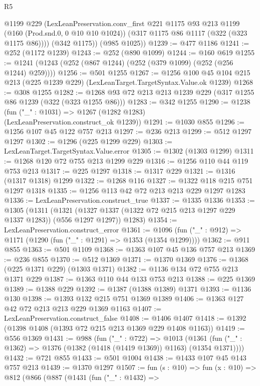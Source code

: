 \begin{lexlean}{R5}
\begin{coremodule}
        @1199
        @229
        (LexLeanPreservation.conv_first
          @221
          @1175
          @93
          @213
          @1199
          (@160 (Prod.snd.{0, 0} @10 @10 @1024))
          (@317 @1175 @86 @1117 (@322 (@323 @1175 @86))))
        (@342 @1175))
      (@985 @1025))
@1239 := @477 @1186
@1241 := @252 (@1172 @1239)
@1243 := @252 (@890 @1099)
@1244 := @160 @619
@1255 := @1241 (@1243 (@252 (@867 @1244) (@252 (@379 @1099) (@252 (@256 @1244) @259))))
@1256 := @501 @1255
@1267 := @1256 @100 @45 @104 @215 @213 (@225 @1239 @229) (LexLeanTarget.TargetSyntax.Value.ok @1239)
@1268 := @308 @1255
@1282 := @1268 @93 @72 @213 @213 @1239 @229 (@317 @1255 @86 @1239 (@322 (@323 @1255 @86)))
@1283 := @342 @1255
@1290 := @1238 (fun ("_" : @1031) => @1267 (@1282 @1283) (LexLeanPreservation.construct_ok @1239))
@1291 := @1030 @855
@1296 := @1256 @107 @45 @122 @757 @213
@1297 := @236 @213
@1299 := @512 @1297 @1297
@1302 := @1296 (@225 @1299 @229)
@1303 := LexLeanTarget.TargetSyntax.Value.error
@1305 := @1302 (@1303 @1299)
@1311 := @1268 @120 @72 @755 @213 @1299 @229
@1316 := @1256 @110 @44 @119 @753 @213
@1317 := @225 @1297
@1318 := @1317 @229
@1321 := @1316 (@1317 @1318) @1299
@1322 := @1268 @116
@1327 := @1322 @118 @215 @751 @1297 @1318
@1335 := @1256 @113 @42 @72 @213 @213 @229 @1297 @1283
@1336 := LexLeanPreservation.construct_true
@1337 := @1335 @1336
@1353 := @1305
    (@1311
      (@1321 (@1327 @1337 (@1322 @72 @215 @213 @1297 @229 @1337 @1283)) (@556 @1297 @1297))
      @1283)
@1354 := LexLeanPreservation.construct_error
@1361 := @1096 (fun ("_" : @912) => @1171 (@1290 (fun ("_" : @1291) => @1353 (@1354 @1299))))
@1362 := @911 @855
@1363 := @501 @1109
@1368 := @1363 @107 @45 @136 @757 @213
@1369 := @236 @855
@1370 := @512 @1369
@1371 := @1370 @1369
@1376 := @1368 (@225 @1371 @229) (@1303 @1371)
@1382 := @1136 @134 @72 @755 @213 @1371 @229
@1387 := @1363 @110 @44 @133 @753 @213
@1388 := @225 @1369
@1389 := @1388 @229
@1392 := @1387 (@1388 @1389) @1371
@1393 := @1136 @130
@1398 := @1393 @132 @215 @751 @1369 @1389
@1406 := @1363 @127 @42 @72 @213 @213 @229 @1369 @1163
@1407 := LexLeanPreservation.construct_false
@1408 := @1406 @1407
@1418 := @1392 (@1398 @1408 (@1393 @72 @215 @213 @1369 @229 @1408 @1163))
@1419 := @556 @1369
@1431 := @988
    (fun ("_" : @722) =>
    @1013 (@1361 (fun ("_" : @1362) => @1376 (@1382 (@1418 (@1419 @1369)) @1163) (@1354 @1371))))
@1432 := @721 @855
@1433 := @501 @1004
@1438 := @1433 @107 @45 @143 @757 @213
@1439 := @1370 @1297
@1507 := fun (s : @10) =>
  fun (x : @10) =>
  @812
    (@866
      (@887
        (@1431
          (fun ("_" : @1432) =>

\end{coremodule}
\end{lexlean}
